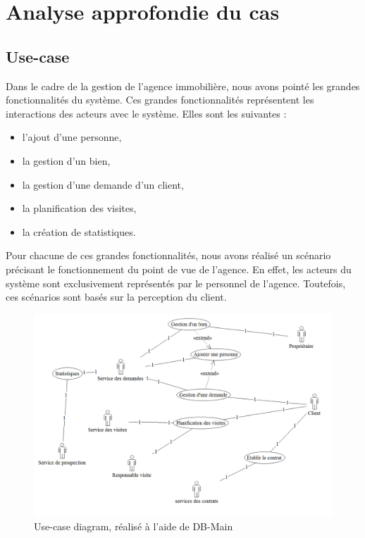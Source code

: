 \section{Analyse approfondie du cas}

\subsection{Use-case}
Dans le cadre de la gestion de l'agence immobilière, nous avons pointé les grandes fonctionnalités du système. Ces grandes fonctionnalités représentent les interactions des acteurs avec le système.
Elles sont les suivantes :
\begin{itemize}
	\item l'ajout d'une personne,
	\item la gestion d'un bien,
	\item la gestion d'une demande d'un client,
	\item la planification des visites,
	\item la création de statistiques.
\end{itemize}
Pour chacune de ces grandes fonctionnalités, nous avons réalisé un scénario précisant le fonctionnement du point de vue de l'agence. En effet, les acteurs du système sont exclusivement représentés par le personnel de l'agence.
Toutefois, ces scénarios sont basés sur la perception du client.\\

\begin{figure}[H]
\centering
\includegraphics[width=16cm]{use-case.png}
\caption{Use-case diagram, réalisé à l'aide de DB-Main}
\label{fig:diagUC}
\end{figure}

